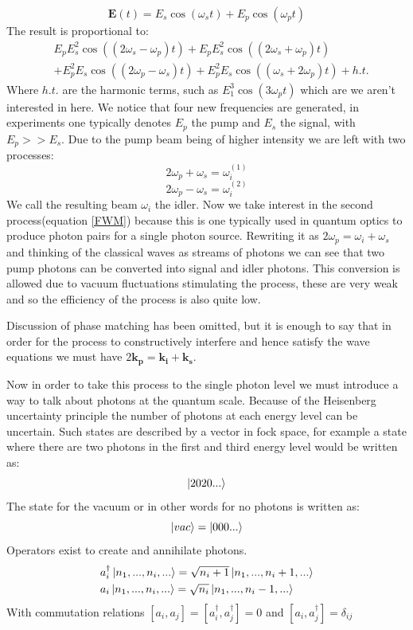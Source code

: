 \begin{equation}
\mathbf{E}(t)=E_s\cos(\omega_st)+E_p\cos(\omega_pt)
\end{equation}
\noindent
The result is proportional to:
\begin{align}
&E_p E_s^2 \cos ((2 {\omega_s}-{\omega_p})t)+E_p E_s^2 \cos ((2 {\omega_s}+{\omega_p})t)\\
&+ E_p^2 E_s \cos ((2{\omega_p}-{\omega_s})t)+ E_p^2 E_s \cos (({\omega_s}+2 \omega_p)t) + h.t.
\end{align}
\noindent
Where $h.t.$ are the harmonic terms, such as $E_1^3\cos(3\omega_p t)$ which are we aren't interested in here. We notice that four new frequencies are generated, in experiments one typically denotes $E_p$ the pump and $E_s$ the signal, with $E_p >> E_s$. Due to the pump beam being of higher intensity we are left with two processes:
\begin{equation}
	2\omega_p+\omega_s = \omega_i^{(1)}
\end{equation}
\begin{equation} \label{FWM}
	2\omega_p-\omega_s = \omega_i^{(2)}
\end{equation}
We call the resulting beam $\omega_i$ the idler. Now we take interest in the second process(equation \ref{FWM}) because this is one typically used in quantum optics to produce photon pairs for a single photon source. Rewriting it as $	2\omega_p = \omega_i+\omega_s$ and thinking of the classical waves as streams of photons we can see that two pump photons can be converted into signal and idler photons. This conversion is allowed due to vacuum fluctuations stimulating the process, these are very weak and so the efficiency of the process is also quite low.

Discussion of phase matching has been omitted, but it is enough to say that in order for the process to constructively interfere and hence satisfy the wave equations we must have $2\mathbf{k_p}=\mathbf{k_i}+\mathbf{k_s}$.


Now in order to take this process to the single photon level we must introduce a way to talk about photons at the quantum scale. Because of the Heisenberg uncertainty principle the number of photons at each energy level can be uncertain. Such states are described by a vector in fock space, for example a state where there are two photons in the first and third energy level would be written as:
\begin{equation}
	\ket{2020...}
\end{equation}
The state for the vacuum or in other words for no photons is written as:
\begin{equation}
	\ket{vac}=\ket{000...}
\end{equation}
Operators exist to create and annihilate photons.
\begin{align}
& a_i^{\dagger}\ket{n_1,...,n_i,...}=\sqrt{n_i+1}\ket{n_1,...,n_i+1,...} \\
& a_i\ket{n_1,...,n_i,...}=\sqrt{n_i}\ket{n_1,...,n_i-1,...} \\
\end{align}
With commutation relations $[a_i,a_j]=[a^{\dagger}_i,a^{\dagger}_j]=0$ and $[a_i,a^{\dagger}_j]=\delta_{ij}$

